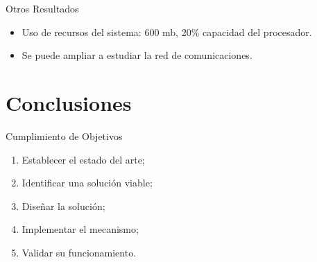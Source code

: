 \documentclass[aspectratio=169]{beamer}
\begin{document}
\begin{frame}{Otros Resultados}
\begin{itemize}
    \item Uso de recursos del sistema: 600 mb, 20\% capacidad del procesador.
    \item Se puede ampliar a estudiar la red de comunicaciones.
\end{itemize}
\end{frame}

\section{Conclusiones}
\begin{frame}{Cumplimiento de Objetivos}
\centering
\begin{minipage}{.8\textwidth}
    \begin{enumerate}\pause
        \item Establecer el estado del arte;\hfill\checkmark\pause
        \item Identificar una solución viable;\hfill\checkmark\pause
        \item Diseñar la solución;\hfill\checkmark\pause
        \item Implementar el mecanismo;\hfill\checkmark\pause
        \item Validar su funcionamiento.\hfill\checkmark
    \end{enumerate}%
\end{minipage}
\end{frame}
\end{document}
